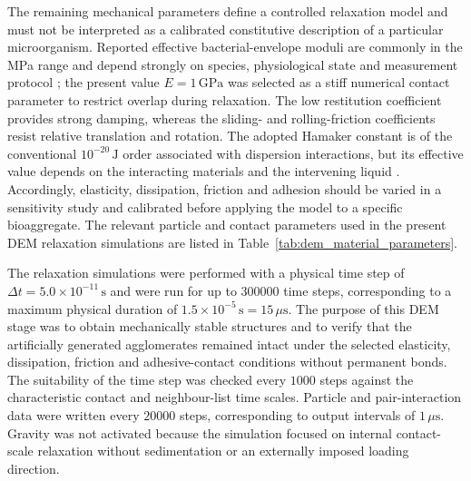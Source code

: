 \documentclass[12pt,a4paper]{article}
\begin{document}
The remaining mechanical parameters define a controlled relaxation model and
must not be interpreted as a calibrated constitutive description of a
particular microorganism. Reported effective bacterial-envelope moduli are
commonly in the MPa range and depend strongly on species, physiological state
and measurement protocol \cite{Deng2011,Lee2024}; the present value
$E=1\,\mathrm{GPa}$ was selected as a stiff numerical contact parameter to
restrict overlap during relaxation. The low restitution coefficient provides
strong damping, whereas the sliding- and rolling-friction coefficients resist
relative translation and rotation. The adopted Hamaker constant is of the
conventional $10^{-20}\,\mathrm{J}$ order associated with dispersion
interactions, but its effective value depends on the interacting materials and
the intervening liquid \cite{Israelachvili2011}. Accordingly, elasticity,
dissipation, friction and adhesion should be varied in a sensitivity study and
calibrated before applying the model to a specific bioaggregate. The relevant particle and contact parameters used in the present DEM relaxation simulations are listed in Table~\ref{tab:dem_material_parameters}.

%
The relaxation simulations were performed with a physical time step of
$\Delta t=5.0\times10^{-11}\,\mathrm{s}$ and were run for up to $300000$ time
steps, corresponding to a maximum physical duration of
$1.5\times10^{-5}\,\mathrm{s}=15\,\mu\mathrm{s}$. The purpose of this DEM stage
was to obtain mechanically stable structures and to verify that the
artificially generated agglomerates remained intact under the selected
elasticity, dissipation, friction and adhesive-contact conditions without
permanent bonds. The suitability of the time step was checked every $1000$
steps against the characteristic contact and neighbour-list time scales.
Particle and pair-interaction data were written every $20000$ steps,
corresponding to output intervals of $1\,\mu\mathrm{s}$. Gravity was not
activated because the simulation focused on internal contact-scale relaxation
without sedimentation or an externally imposed loading direction.
\end{document}
